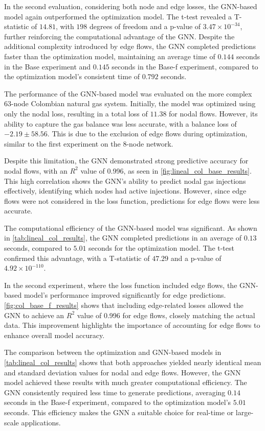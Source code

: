 In the second evaluation, considering both node and edge losses, the GNN-based model again outperformed the optimization model. The t-test revealed a T-statistic of $14.81$, with $198$ degrees of freedom and a p-value of $3.47 \times 10^{-34}$, further reinforcing the computational advantage of the GNN. Despite the additional complexity introduced by edge flows, the GNN completed predictions faster than the optimization model, maintaining an average time of $0.144$ seconds in the Base experiment and $0.145$ seconds in the Base-f experiment, compared to the optimization model's consistent time of $0.792$ seconds.




The performance of the GNN-based model was evaluated on the more complex 63-node Colombian natural gas system. Initially, the model was optimized using only the nodal loss, resulting in a total loss of $11.38$ for nodal flows. However, its ability to capture the gas balance was less accurate, with a balance loss of $-2.19 \pm 58.56$. This is due to the exclusion of edge flows during optimization, similar to the first experiment on the 8-node network.

Despite this limitation, the GNN demonstrated strong predictive accuracy for nodal flows, with an $R^2$ value of 0.996, as seen in \cref{fig:lineal_col_base_results}. This high correlation shows the GNN's ability to predict nodal gas injections effectively, identifying which nodes had active injections. However, since edge flows were not considered in the loss function, predictions for edge flows were less accurate.

The computational efficiency of the GNN-based model was significant. As shown in \cref{tab:lineal_col_results}, the GNN completed predictions in an average of $0.13$ seconds, compared to $5.01$ seconds for the optimization model. The t-test confirmed this advantage, with a T-statistic of $47.29$ and a p-value of $4.92 \times 10^{-110}$.

In the second experiment, where the loss function included edge flows, the GNN-based model's performance improved significantly for edge predictions. \cref{fig:col_base_f_results} shows that including edge-related losses allowed the GNN to achieve an $R^2$ value of 0.996 for edge flows, closely matching the actual data. This improvement highlights the importance of accounting for edge flows to enhance overall model accuracy.

The comparison between the optimization and GNN-based models in \cref{tab:lineal_col_results} shows that both approaches yielded nearly identical mean and standard deviation values for nodal and edge flows. However, the GNN model achieved these results with much greater computational efficiency. The GNN consistently required less time to generate predictions, averaging $0.14$ seconds in the Base-f experiment, compared to the optimization model's $5.01$ seconds. This efficiency makes the GNN a suitable choice for real-time or large-scale applications.

